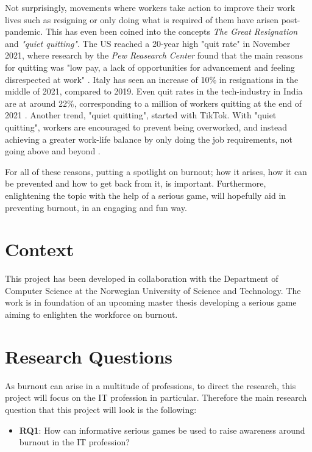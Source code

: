 Not surprisingly, movements where workers take action to improve their work lives such as resigning or only doing what is required of them have arisen post-pandemic. This has even been coined into the concepts \textit{The Great Resignation} and \textit{"quiet quitting"}. The US reached a 20-year high "quit rate" in November 2021, where research by the \textit{Pew Reasearch Center} found that the main reasons for quitting was "low pay, a lack of opportunities for advancement and feeling disrespected at work" \parencite{parker_majority_2022}. Italy has seen an increase of 10\% in resignations in the middle of 2021, compared to 2019. Even quit rates in the tech-industry in India are at around 22\%, corresponding to a million of workers quitting at the end of 2021 \parencite{armillei_si_2021}. Another trend, "quiet quitting", started with TikTok. With "quiet quitting", workers are encouraged to prevent being overworked, and instead achieving a greater work-life balance by only doing the job requirements, not going above and beyond \parencite{rosalsky_economics_2022}.

For all of these reasons, putting a spotlight on burnout; how it arises, how it can be prevented and how to get back from it, is important. Furthermore, enlightening the topic with the help of a serious game, will hopefully aid in preventing burnout, in an engaging and fun way.

\section{Context}
This project has been developed in collaboration with the Department of Computer Science at the Norwegian University of Science and Technology. The work is in foundation of an upcoming master thesis developing a serious game aiming to enlighten the workforce on burnout. 

\section{Research Questions}

As burnout can arise in a multitude of professions, to direct the research, this project will focus on the IT profession in particular. Therefore the main research question that this project will look is the following:

\begin{itemize}
    \item[] \textbf{RQ1}: How can informative serious games be used to raise awareness around burnout in the IT profession?
\end{itemize}


